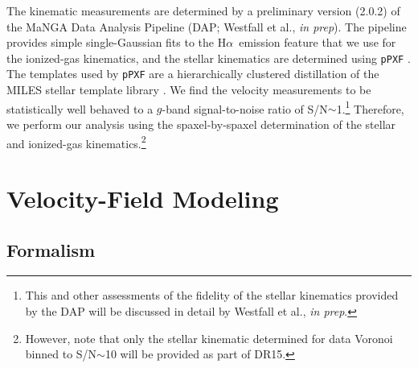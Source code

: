 \documentclass[apj,iop,revtex4,numberedappendix]{emulateapj}
\newcommand{\halpha}{H$\alpha$}
\begin{document}
The kinematic measurements are determined by a preliminary version
(2.0.2) of the MaNGA Data Analysis Pipeline (DAP; Westfall et al., {\it
in prep}).  The pipeline provides simple single-Gaussian fits to the
\halpha\ emission feature that we use for the ionized-gas kinematics,
and the stellar kinematics are determined using {\tt pPXF}
\citep{2004PASP..116..138C, 2017MNRAS.466..798C}.  The templates used by
{\tt pPXF} are a hierarchically clustered distillation of the MILES
stellar template library \citep{2011A&A...532A..95F}.  We find the
velocity measurements to be statistically well behaved to a $g$-band
signal-to-noise ratio of S/N$\sim$1.\footnote{
%
This and other assessments of the fidelity of the stellar kinematics
provided by the DAP will be discussed in detail by Westfall et al., {\it
in prep}.}
%
Therefore, we perform our analysis using the spaxel-by-spaxel
determination of the stellar and ionized-gas kinematics.\footnote{
%
However, note that only the stellar kinematic determined for data
Voronoi binned to S/N$\sim$10 will be provided as part of DR15.}


\section{Velocity-Field Modeling}

\subsection{Formalism}
\end{document}
